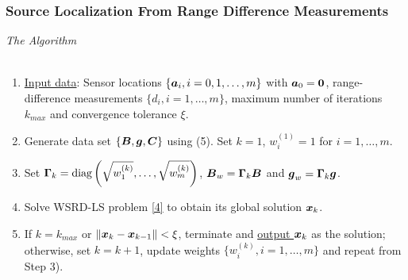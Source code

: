 
\begin{frame}
\frametitle{Source Localization From Range Difference Measurements}
{\large \textit{The Algorithm}} \\~\\
\normalsize
\begin{enumerate}
\item %
\underline{Input data}: Sensor locations $\{\mbox{\boldmath$a$}_i, i=0, 1,\ldots,m\}$ with $\mbox{\boldmath$a$}_0=\mbox{\boldmath{$0$}}$, range-difference measurements $\{d_i, i = 1,\ldots,m\}$, maximum number of iterations $k_{max}$ and convergence tolerance $\xi$.
\item %
Generate data set $\{\mbox{\boldmath$B$}, \mbox{\boldmath$g$}, \mbox{\boldmath$C$}\}$ using (5). Set $k=1$, $w_i^{(1)}=1$ for $i=1,\ldots,m.$
\item %
Set $\mbox{\boldmath{$\Gamma$}}_k=\mbox{diag}\left(\sqrt{w_1^{(k)}},\ldots,\sqrt{w_m^{(k)}}\right)$, $\mbox{\boldmath$B$}_w=\mbox{\boldmath{$\Gamma$}}_k\mbox{\boldmath$B$}$ and $\mbox{\boldmath$g$}_w=\mbox{\boldmath{$\Gamma$}}_k\mbox{\boldmath$g$}$.
\item %
Solve WSRD-LS problem \eqref{4} to obtain its global solution $\mbox{\boldmath$x$}_k$.
\item %
If $k=k_{max}$ or $\|\mbox{\boldmath$x$}_k-\mbox{\boldmath$x$}_{k-1}\|<\xi$, terminate and \underline{output $\mbox{\boldmath$x$}_k$} as the solution; otherwise, set $k=k+1$, update weights $\{w_i^{(k)}, i=1,\ldots,m\}$ and repeat from Step 3).
\end{enumerate}
\end{frame}


